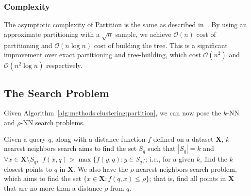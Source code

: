 

\subsubsection {Complexity}
\label{subsubsec:methods:clustering:clustering:complexity}

The asymptotic complexity of Partition is the same as described in~\cite{ishaq2019clustered}.
By using an approximate partitioning with a $\sqrt{n}$ sample, we achieve $\mathcal{O}(n)$ cost of partitioning and $\mathcal{O}(n \log n)$ cost of building the tree.
This is a significant improvement over exact partitioning and tree-building, which cost $\mathcal{O}(n^2)$ and $\mathcal{O}(n^2 \log n)$ respectively.


\subsection{The Search Problem}
\label{subsec:methods:the-search-problem}

Given Algorithm~\ref{alg:methods:clustering:partition}, we can now pose the $k$-NN and $\rho$-NN search problems.

Given a query $q$, along with a distance function $f$ defined on a dataset $\textbf{X}$, $k$-nearest neighbors search aims to find the set $S_q$ such that $|S_q| = k$ and $\forall x \in \textbf{X} \setminus S_q$, $\ f(x, q) > \max\{f(y, q): y \in S_q \}$;
i.e., for a given $k$, find the $k$ closest points to $q$ in $\textbf{X}$.
We also have the $\rho$-nearest neighbors search problem, which aims to find the set $\{x \in \textbf{X}: f(q, x) \leq \rho \}$;
that is, find all points in $\textbf{X}$ that are no more than a distance $\rho$ from $q$.

